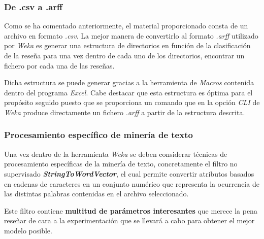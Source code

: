 \documentclass[12pt,a4paper, xcolor=table]{article}
\begin{document}
        \subsubsection{De .csv a .arff}

          Como se ha comentado anteriormente, el material proporcionado consta de un archivo en formato \textit{.csv}. La mejor manera de convertirlo al formato \textit{.arff} utilizado por \textit{Weka} es generar una estructura de directorios en función de la clasificación de la reseña para una vez dentro de cada uno de los directorios, encontrar un fichero por cada una de las reseñas.

          \vspace{1mm}

          Dicha estructura se puede generar gracias a la herramienta de \textit{Macros} contenida dentro del programa \textit{Excel}. Cabe destacar que esta estructura es óptima para el propósito seguido puesto que se proporciona un comando que en la opción \textit{CLI} de \textit{Weka} produce directamente un fichero \textit{.arff} a partir de la estructura descrita.

        \subsubsection{Procesamiento específico de minería de texto}
          Una vez dentro de la herramienta \textit{Weka} se deben considerar técnicas de procesamiento específicas de la minería de texto, concretamente el filtro no supervisado \textbf{\textit{StringToWordVector}}, el cual permite convertir atributos basados en cadenas de caracteres en un conjunto numérico que representa la ocurrencia de las distintas palabras contenidas en el archivo seleccionado.

          \vspace{1mm}

          Este filtro contiene \textbf{multitud de parámetros interesantes }que merece la pena reseñar de cara a la experimentación que se llevará a cabo para obtener el mejor modelo posible.
\end{document}
